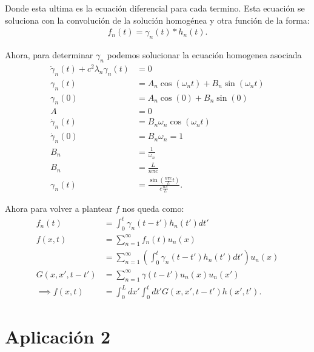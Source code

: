 \documentclass{report}
\begin{document}
Donde esta ultima es la ecuación diferencial para cada termino. Esta ecuación se soluciona con la convolución de la solución homogénea y otra función de la forma:
\begin{align*}
  f_n\left( t \right) = \gamma_n\left( t \right) * h_n\left( t \right) 
.\end{align*}

Ahora, para determinar $\gamma_n$ podemos solucionar la ecuación homogenea asociada
 \begin{align*}
   \ddot{\gamma}_n\left( t \right) + c^2\lambda_n \gamma_n\left( t \right) &= 0 \\
   \gamma_n\left( t \right) &= A_n \cos\left( \omega_n t \right) + B_n \sin\left( \omega_n t \right)  \\
   \gamma_n\left( 0 \right) &= A_n \cos\left( 0 \right) + B_n \sin\left( 0 \right)  \\
   A &= 0 \\
   \dot{\gamma}_n\left( t \right) &= B_n\omega_n \cos\left( \omega_n t \right)  \\
   \dot{\gamma}_n\left( 0 \right) &= B_n\omega_n = 1  \\
   B_n &= \frac{1}{\omega_n} \\
   B_n &= \frac{L}{n\pi c} \\
   \gamma_n\left( t \right) &= \frac{\sin\left( \frac{n\pi c}{L}t \right) }{c \frac{n\pi}{L}}
.\end{align*}

Ahora para volver a plantear $f$ nos queda como:
\begin{align*}
  f_n\left( t \right) &= \int_{0}^{t} \gamma_n \left( t - t' \right) h_n\left( t' \right) dt' \\
  f\left( x, t \right) &= \sum_{n=1}^{\infty} f_n\left( t \right) u_n\left( x \right) \\
  &= \sum_{n=1}^{\infty} \left( \int_{0}^{t}\gamma_n\left( t - t' \right) h_n\left( t' \right) dt' \right) u_n\left( x \right)  \\
  G\left( x, x', t - t' \right) &= \sum_{n=1}^{\infty} \gamma\left( t - t' \right) u_n\left( x \right) u_n\left( x' \right)  \\
  \implies f\left( x, t \right) &= \int_{0}^{L}dx'\int_{0}^{t} dt'G\left( x, x', t - t' \right) h\left( x', t' \right)
.\end{align*}

\chapter{Aplicación 2}
\end{document}
